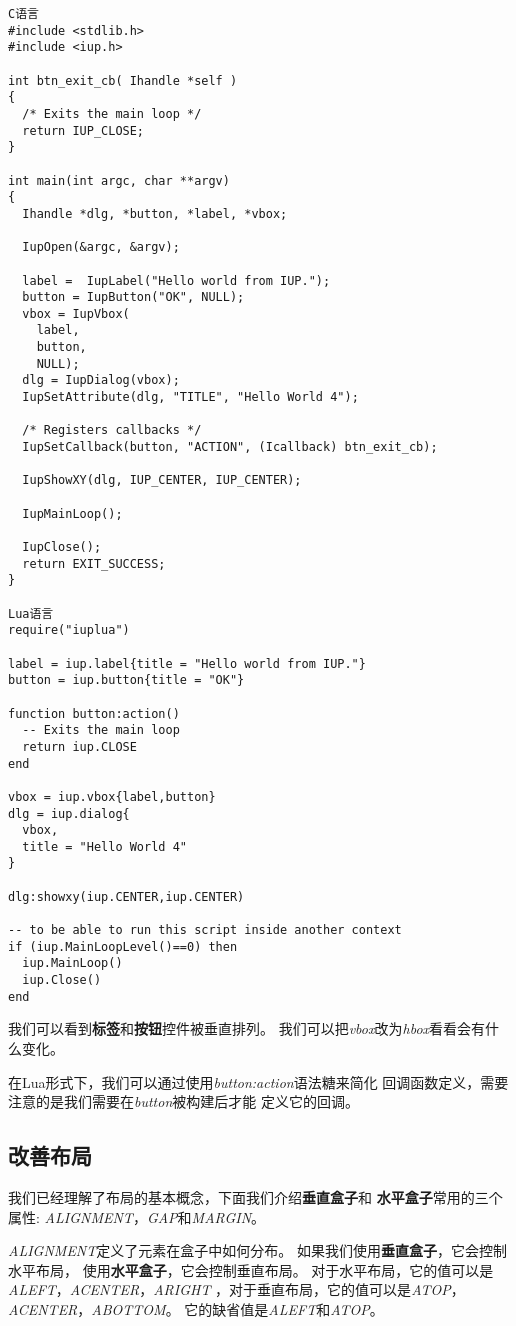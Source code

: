 \documentclass{ctexart}
\begin{document}
\lstset{language=C}
\begin{lstlisting}
C语言
#include <stdlib.h>
#include <iup.h>

int btn_exit_cb( Ihandle *self )
{
  /* Exits the main loop */
  return IUP_CLOSE;
}

int main(int argc, char **argv)
{
  Ihandle *dlg, *button, *label, *vbox;

  IupOpen(&argc, &argv);
  
  label =  IupLabel("Hello world from IUP.");
  button = IupButton("OK", NULL);
  vbox = IupVbox(
    label,
    button,
    NULL);
  dlg = IupDialog(vbox);
  IupSetAttribute(dlg, "TITLE", "Hello World 4");

  /* Registers callbacks */
  IupSetCallback(button, "ACTION", (Icallback) btn_exit_cb);

  IupShowXY(dlg, IUP_CENTER, IUP_CENTER);

  IupMainLoop();

  IupClose();
  return EXIT_SUCCESS;
}

Lua语言
require("iuplua")

label = iup.label{title = "Hello world from IUP."}
button = iup.button{title = "OK"}

function button:action()
  -- Exits the main loop
  return iup.CLOSE  
end

vbox = iup.vbox{label,button}
dlg = iup.dialog{
  vbox,
  title = "Hello World 4"
}

dlg:showxy(iup.CENTER,iup.CENTER)

-- to be able to run this script inside another context
if (iup.MainLoopLevel()==0) then
  iup.MainLoop()
  iup.Close()
end
\end{lstlisting}

我们可以看到\textbf{标签}和\textbf{按钮}控件被垂直排列。
我们可以把\emph{vbox}改为\emph{hbox}看看会有什么变化。

在Lua形式下，我们可以通过使用\emph{button:action}语法糖来简化
回调函数定义，需要注意的是我们需要在\emph{button}被构建后才能
定义它的回调。

\subsection{改善布局}

我们已经理解了布局的基本概念，下面我们介绍\textbf{垂直盒子}和
\textbf{水平盒子}常用的三个属性:
\emph{ALIGNMENT}，\emph{GAP}和\emph{MARGIN}。

\emph{ALIGNMENT}定义了元素在盒子中如何分布。
如果我们使用\textbf{垂直盒子}，它会控制水平布局，
使用\textbf{水平盒子}，它会控制垂直布局。
对于水平布局，它的值可以是\emph{ALEFT}，\emph{ACENTER}，\emph{ARIGHT}
，对于垂直布局，它的值可以是\emph{ATOP}，
\emph{ACENTER}，\emph{ABOTTOM}。
它的缺省值是\emph{ALEFT}和\emph{ATOP}。
\end{document}
